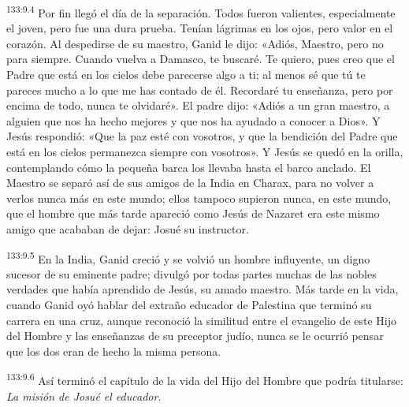\par 
\textsuperscript{133:9.4} Por fin llegó el día de la separación. Todos fueron valientes, especialmente el joven, pero fue una dura prueba. Tenían lágrimas en los ojos, pero valor en el corazón. Al despedirse de su maestro, Ganid le dijo: «Adiós, Maestro, pero no para siempre. Cuando vuelva a Damasco, te buscaré. Te quiero, pues creo que el Padre que está en los cielos debe parecerse algo a ti; al menos sé que tú te pareces mucho a lo que me has contado de él. Recordaré tu enseñanza, pero por encima de todo, nunca te olvidaré». El padre dijo: «Adiós a un gran maestro, a alguien que nos ha hecho mejores y que nos ha ayudado a conocer a Dios». Y Jesús respondió: «Que la paz esté con vosotros, y que la bendición del Padre que está en los cielos permanezca siempre con vosotros». Y Jesús se quedó en la orilla, contemplando cómo la pequeña barca los llevaba hasta el barco anclado. El Maestro se separó así de sus amigos de la India en Charax, para no volver a verlos nunca más en este mundo; ellos tampoco supieron nunca, en este mundo, que el hombre que más tarde apareció como Jesús de Nazaret era este mismo amigo que acababan de dejar: Josué su instructor.

\par 
\textsuperscript{133:9.5} En la India, Ganid creció y se volvió un hombre influyente, un digno sucesor de su eminente padre; divulgó por todas partes muchas de las nobles verdades que había aprendido de Jesús, su amado maestro. Más tarde en la vida, cuando Ganid oyó hablar del extraño educador de Palestina que terminó su carrera en una cruz, aunque reconoció la similitud entre el evangelio de este Hijo del Hombre y las enseñanzas de su preceptor judío, nunca se le ocurrió pensar que los dos eran de hecho la misma persona.

\par 
\textsuperscript{133:9.6} Así terminó el capítulo de la vida del Hijo del Hombre que podría titularse: \textit{La misión de Josué el educador}.